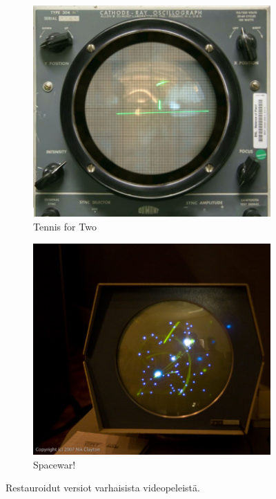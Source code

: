 \documentclass[utf8,bachelor]{gradu3}
\begin{document}
\begin{figure} [!b]
    \begin{subfigure}[t]{0.5\textwidth}
        \centering
        \includegraphics[width=0.8\linewidth]{tennis.jpg}
        \caption{Tennis for Two \parencite{RefWorks:doc:5be168bae4b0273295d7dca5}}\label{tennis}
    \end{subfigure}
    \begin{subfigure}[t]{0.5\textwidth}
        \centering
        \includegraphics[width=0.8\linewidth]{spacewar.jpg}
        \caption{Spacewar! \parencite{RefWorks:doc:5be162dfe4b0e42e08f77175}}\label{spacewar}
    \end{subfigure}
    \caption{Restauroidut versiot varhaisista videopeleistä.}
\end{figure}
\end{document}
